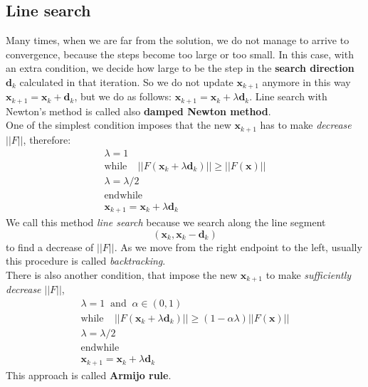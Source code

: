    \subsection{Line search} \label{line_search} Many times, when we are far from the solution, we do not manage to arrive to convergence, because the steps become too large or too small. In this case, with an extra condition, we decide how large to be the step in the \textbf{search direction} $\textbf{d}_k$ calculated in that iteration. So we do not update $\textbf{x}_{k+1}$ anymore in this way $\textbf{x}_{k+1} = \textbf{x}_{k} + \textbf{d}_k$, but we do as follows: $\textbf{x}_{k+1} = \textbf{x}_{k} + \lambda \textbf{d}_k$. Line search with Newton’s method is called also \textbf{damped Newton method}. \\
   One of the simplest condition imposes that the new $\textbf{x}_{k+1}$ has to make \textit{decrease} $||F||$, therefore:
   \begin{gather*}
   	\lambda = 1\\
   \text{while} \;\;\;\; ||F(\textbf{x}_{k} + \lambda \textbf{d}_k)|| \geq ||F(\textbf{x})||\\
   \lambda = \lambda /2 \\
   \text{endwhile}\\
   \textbf{x}_{k+1}=\textbf{x}_k + \lambda \textbf{d}_k
   \end{gather*}
     We call this method \textit{line search} because we search along the line segment
     \begin{equation*}
     (\textbf{x}_k, \textbf{x}_k - \textbf{d}_k)
     \end{equation*}
     to find a decrease of $||F||$. As we move from the right endpoint to the left, usually this procedure is called \textit{backtracking}.\\
    There is also another condition, that impose the new $\textbf{x}_{k+1}$ to make \textit{sufficiently decrease} $||F||$,
    \begin{gather*}
    	\lambda = 1 \; \; \text{and} \; \; \alpha \in (0,1)\\
    	\text{while} \; \;\;\;||F( \textbf{x}_{k} + \lambda \textbf{d}_k)|| \geq (1-\alpha\lambda)||F(\textbf{x})||\\
    	\lambda = \lambda /2 \\
    \text{endwhile}\\
    	\textbf{x}_{k+1}=\textbf{x}_k + \lambda \textbf{d}_k
    \end{gather*}
   This approach is called \textbf{Armijo rule}. \\
